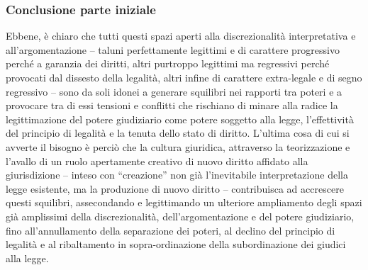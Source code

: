 \subsubsection{Conclusione parte iniziale}
Ebbene, è chiaro che tutti questi spazi aperti alla discrezionalità interpretativa e all’argomentazione – taluni perfettamente legittimi e di carattere progressivo perché a garanzia dei diritti, altri purtroppo legittimi ma regressivi perché provocati dal dissesto della legalità, altri infine di carattere extra-legale e di segno regressivo – sono da soli idonei a generare squilibri nei rapporti tra poteri e a provocare tra di essi tensioni e conflitti che rischiano di minare alla radice la legittimazione del potere giudiziario come potere soggetto alla legge, l’effettività del principio di legalità e la tenuta dello stato di diritto. L’ultima cosa di cui si avverte il bisogno è perciò che la cultura giuridica, attraverso la teorizzazione e l’avallo di un ruolo apertamente creativo di nuovo diritto affidato alla giurisdizione – inteso con “creazione” non già l’inevitabile interpretazione della legge esistente, ma la produzione di nuovo diritto – contribuisca ad accrescere questi squilibri, assecondando e legittimando un ulteriore ampliamento degli spazi già amplissimi della discrezionalità, dell’argomentazione e del potere giudiziario, fino all’annullamento della separazione dei poteri, al declino del principio di legalità e al ribaltamento in sopra-ordinazione della subordinazione dei giudici alla legge.
